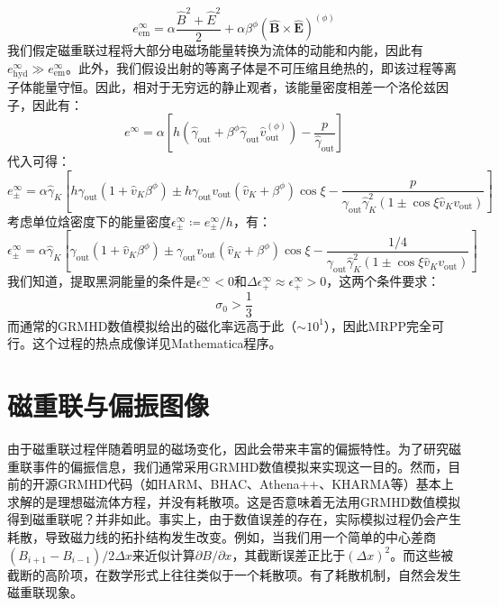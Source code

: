 \documentclass[lang=cn,color=blue,cm,11pt,scheme=chinese,bibend=bibtex,sorting=nty]{elegantbook}
\begin{document}
	\begin{equation}
		e^{\infty}_{\text{em}} = \alpha \frac{\hat{B}^2 + \hat{E}^2}{2} + \alpha \beta^{\phi} (\hat{\bm{B}} \times \hat{\bm{E}})^{(\phi)}
	\end{equation}
	我们假定磁重联过程将大部分电磁场能量转换为流体的动能和内能，因此有$e^{\infty}_{\text{hyd}} \gg e^{\infty}_{\text{em}}$。此外，我们假设出射的等离子体是不可压缩且绝热的，即该过程等离子体能量守恒。因此，相对于无穷远的静止观者，该能量密度相差一个洛伦兹因子，因此有：
	\begin{equation}
		e^{\infty} = \alpha \left[ h (\hat{\gamma}_{\text{out}} + \beta^{\phi} \hat{\gamma}_{\text{out}} \hat{v}^{(\phi)}_{\text{out}}) - \frac{p}{\hat{\gamma}_{\text{out}}} \right]
	\end{equation}
	代入可得：
	\begin{equation}
		e^{\infty}_{\pm} = \alpha \hat{\gamma}_K \left[ h \gamma_{\text{out}} (1 + \hat{v}_K \beta^{\phi}) \pm h \gamma_{\text{out}} v_{\text{out}} (\hat{v}_K + \beta^{\phi}) \cos \xi - \frac{p}{\gamma_{\text{out}} \hat{\gamma}_K^2 (1 \pm \cos \xi \hat{v}_K v_{\text{out}})} \right]
	\end{equation}
	考虑单位焓密度下的能量密度$\epsilon^{\infty}_{\pm} \coloneqq e^{\infty}_{\pm} / h$，有：
	\begin{equation}
		\epsilon^{\infty}_{\pm} = \alpha \hat{\gamma}_K \left[ \gamma_{\text{out}} (1 + \hat{v}_K \beta^{\phi}) \pm \gamma_{\text{out}} v_{\text{out}} (\hat{v}_K + \beta^{\phi}) \cos \xi - \frac{1 / 4}{\gamma_{\text{out}} \hat{\gamma}_K^2 (1 \pm \cos \xi \hat{v}_K v_{\text{out}})} \right]
	\end{equation}
	我们知道，提取黑洞能量的条件是$\epsilon^{\infty}_- < 0$和$\Delta \epsilon^{\infty}_+ \approx \epsilon^{\infty}_+ > 0$，这两个条件要求：
	\begin{equation}
		\sigma_0 > \frac{1}{3}
	\end{equation}
	而通常的GRMHD数值模拟给出的磁化率远高于此（$\sim 10^1$），因此MRPP完全可行。这个过程的热点成像详见Mathematica程序。
	
	\section{磁重联与偏振图像}
	
	由于磁重联过程伴随着明显的磁场变化，因此会带来丰富的偏振特性。为了研究磁重联事件的偏振信息，我们通常采用GRMHD数值模拟来实现这一目的。然而，目前的开源GRMHD代码（如HARM、BHAC、Athena++、KHARMA等）基本上求解的是理想磁流体方程，并没有耗散项。这是否意味着无法用GRMHD数值模拟得到磁重联呢？并非如此。事实上，由于数值误差的存在，实际模拟过程仍会产生耗散，导致磁力线的拓扑结构发生改变。例如，当我们用一个简单的中心差商$(B_{i+1} - B_{i-1}) / 2 \Delta x$来近似计算$\partial B / \partial x$，其截断误差正比于$(\Delta x)^2$。而这些被截断的高阶项，在数学形式上往往类似于一个耗散项。有了耗散机制，自然会发生磁重联现象。
	
\end{document}
